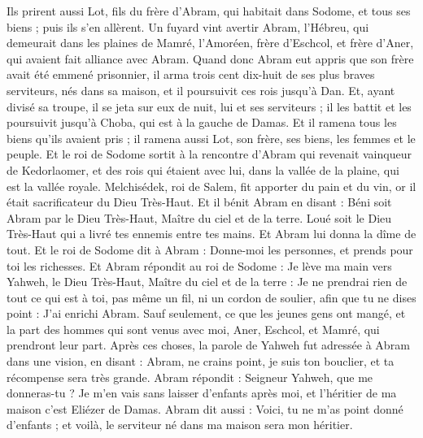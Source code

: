 \begin{multicols}{2}
Ils prirent aussi Lot, fils du frère d'Abram, qui habitait dans Sodome, et tous ses biens ; puis ils s'en allèrent.
Un fuyard vint avertir Abram, l'Hébreu, qui demeurait dans les plaines de Mamré, l'Amoréen, frère d'Eschcol, et frère d'Aner, qui avaient fait alliance avec Abram.
Quand donc Abram eut appris que son frère avait été emmené prisonnier, il arma trois cent dix-huit de ses plus braves serviteurs, nés dans sa maison, et il poursuivit ces rois jusqu'à Dan.
Et, ayant divisé sa troupe, il se jeta sur eux de nuit, lui et ses serviteurs ; il les battit et les poursuivit jusqu'à Choba, qui est à la gauche de Damas.
Et il ramena tous les biens qu'ils avaient pris ; il ramena aussi Lot, son frère, ses biens, les femmes et le peuple.
Et le roi de Sodome sortit à la rencontre d'Abram qui revenait vainqueur de Kedorlaomer, et des rois qui étaient avec lui, dans la vallée de la plaine, qui est la vallée royale.
Melchisédek, roi de Salem, fit apporter du pain et du vin, or il était sacrificateur du Dieu Très-Haut.
Et il bénit Abram en disant : Béni soit Abram par le Dieu Très-Haut, Maître du ciel et de la terre.
Loué soit le Dieu Très-Haut qui a livré tes ennemis entre tes mains. Et Abram lui donna la dîme de tout.
Et le roi de Sodome dit à Abram : Donne-moi les personnes, et prends pour toi les richesses.
Et Abram répondit au roi de Sodome : Je lève ma main vers Yahweh, le Dieu Très-Haut, Maître du ciel et de la terre :
Je ne prendrai rien de tout ce qui est à toi, pas même un fil, ni un cordon de soulier, afin que tu ne dises point : J'ai enrichi Abram.
Sauf seulement, ce que les jeunes gens ont mangé, et la part des hommes qui sont venus avec moi, Aner, Eschcol, et Mamré, qui prendront leur part.
\VerseOne{}Après ces choses, la parole de Yahweh fut adressée à Abram dans une vision, en disant : Abram, ne crains point, je suis ton bouclier, et ta récompense sera très grande.
Abram répondit : Seigneur Yahweh, que me donneras-tu ? Je m'en vais sans laisser d'enfants après moi, et l'héritier de ma maison c'est Eliézer de Damas.
Abram dit aussi : Voici, tu ne m'as point donné d'enfants ; et voilà, le serviteur né dans ma maison sera mon héritier.

\end{multicols}

